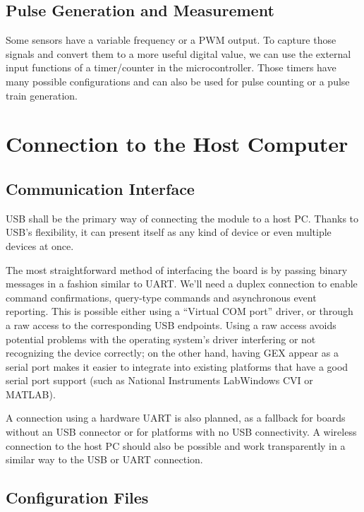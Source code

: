 \subsection{Pulse Generation and Measurement}

Some sensors have a variable frequency or a \gls{PWM} output. To capture those signals and convert them to a more useful digital value, we can use the external input functions of a timer/counter in the microcontroller. Those timers have many possible configurations and can also be used for pulse counting or a pulse train generation.

\section{Connection to the Host Computer}

\subsection{Communication Interface}

\gls{USB} shall be the primary way of connecting the module to a host \gls{PC}. Thanks to \gls{USB}'s flexibility, it can present itself as any kind of device or even multiple devices at once.

The most straightforward method of interfacing the board is by passing binary messages in a fashion similar to \gls{UART}. We'll need a duplex connection to enable command confirmations, query-type commands and asynchronous event reporting. This is possible either using a ``Virtual COM port'' driver, or through a raw access to the corresponding \gls{USB} endpoints. Using a raw access avoids potential problems with the operating system's driver interfering or not recognizing the device correctly; on the other hand, having GEX appear as a serial port makes it easier to integrate into existing platforms that have a good serial port support (such as National Instruments LabWindows CVI or MATLAB).

A connection using a hardware \gls{UART} is also planned, as a fallback for boards without an USB connector or for platforms with no \gls{USB} connectivity. A wireless connection to the host PC should also be possible and work transparently in a similar way to the \gls{USB} or \gls{UART} connection.

\subsection{Configuration Files}

